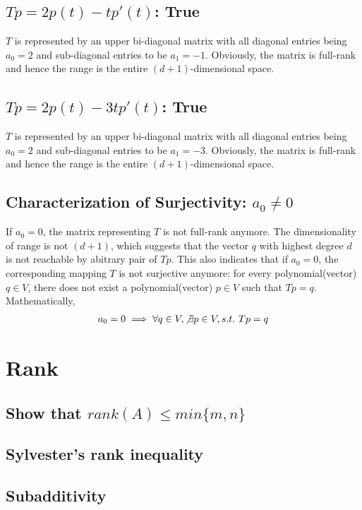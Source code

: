 \documentclass[11pt,a4paper]{report}
\begin{document}
\subsection{$Tp=2p(t)-tp'(t)$: True}
$T$ is represented by an upper bi-diagonal matrix with all diagonal entries
being $a_0=2$ and sub-diagonal entries to be $a_1=-1$. Obviously, the matrix
is full-rank and hence the range is the entire $(d+1)$-dimensional space.
\subsection{$Tp=2p(t)-3tp'(t)$: True}
$T$ is represented by an upper bi-diagonal matrix with all diagonal entries
being $a_0=2$ and sub-diagonal entries to be $a_1=-3$.
Obviously, the matrix is full-rank and hence the range is the entire
$(d+1)$-dimensional space.
\subsection{Characterization of Surjectivity: $a_0 \not = 0$}

If $a_0 = 0$, the matrix representing $T$ is not full-rank anymore. The
dimensionality of range is not $(d+1)$, which suggests that the vector $q$ with
highest degree $d$ is not reachable by abitrary pair of $Tp$. This also
indicates that if $a_0 = 0$,  the corresponding mapping $T$ is not surjective
anymore: for every polynomial(vector) $q \in V$, there does not exist a
polynomial(vector) $p \in V$ such that $Tp = q$. Mathematically, 
\begin{align}
    a_0 = 0 \implies \forall q \in V, \not \exists p \in V, s.t.\ Tp=q
\end{align}


\section{Rank}
\subsection{Show that $rank(A) \leq min\{m, n\}$}

\subsection{Sylvester's rank inequality}

\subsection{Subadditivity}
\end{document}
